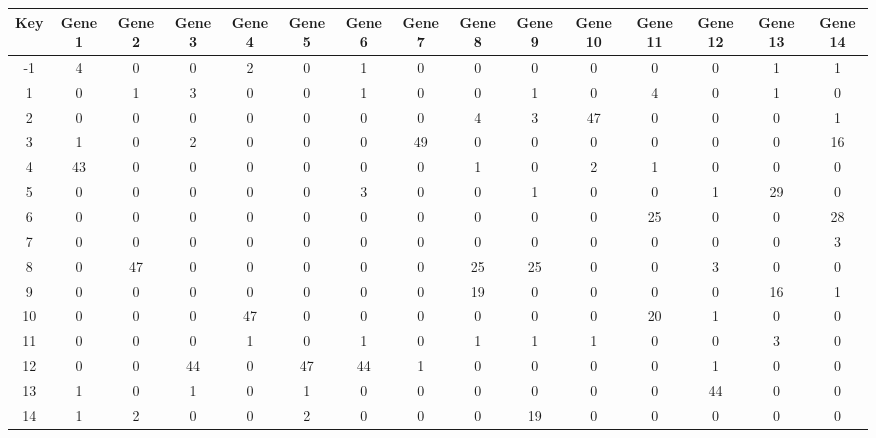 \begin{tabular}{|c|c|c|c|c|c|c|c|c|c|c|c|c|c|c|}
\hline
Key & Gene 1 & Gene 2 & Gene 3 & Gene 4 & Gene 5 & Gene 6 & Gene 7 & Gene 8 & Gene 9 & Gene 10 & Gene 11 & Gene 12 & Gene 13 & Gene 14 \\
\hline
-1 & 4 & 0 & 0 & 2 & 0 & 1 & 0 & 0 & 0 & 0 & 0 & 0 & 1 & 1 \\
1 & 0 & 1 & 3 & 0 & 0 & 1 & 0 & 0 & 1 & 0 & 4 & 0 & 1 & 0 \\
2 & 0 & 0 & 0 & 0 & 0 & 0 & 0 & 4 & 3 & 47 & 0 & 0 & 0 & 1 \\
3 & 1 & 0 & 2 & 0 & 0 & 0 & 49 & 0 & 0 & 0 & 0 & 0 & 0 & 16 \\
4 & 43 & 0 & 0 & 0 & 0 & 0 & 0 & 1 & 0 & 2 & 1 & 0 & 0 & 0 \\
5 & 0 & 0 & 0 & 0 & 0 & 3 & 0 & 0 & 1 & 0 & 0 & 1 & 29 & 0 \\
6 & 0 & 0 & 0 & 0 & 0 & 0 & 0 & 0 & 0 & 0 & 25 & 0 & 0 & 28 \\
7 & 0 & 0 & 0 & 0 & 0 & 0 & 0 & 0 & 0 & 0 & 0 & 0 & 0 & 3 \\
8 & 0 & 47 & 0 & 0 & 0 & 0 & 0 & 25 & 25 & 0 & 0 & 3 & 0 & 0 \\
9 & 0 & 0 & 0 & 0 & 0 & 0 & 0 & 19 & 0 & 0 & 0 & 0 & 16 & 1 \\
10 & 0 & 0 & 0 & 47 & 0 & 0 & 0 & 0 & 0 & 0 & 20 & 1 & 0 & 0 \\
11 & 0 & 0 & 0 & 1 & 0 & 1 & 0 & 1 & 1 & 1 & 0 & 0 & 3 & 0 \\
12 & 0 & 0 & 44 & 0 & 47 & 44 & 1 & 0 & 0 & 0 & 0 & 1 & 0 & 0 \\
13 & 1 & 0 & 1 & 0 & 1 & 0 & 0 & 0 & 0 & 0 & 0 & 44 & 0 & 0 \\
14 & 1 & 2 & 0 & 0 & 2 & 0 & 0 & 0 & 19 & 0 & 0 & 0 & 0 & 0 \\
\hline
\end{tabular}